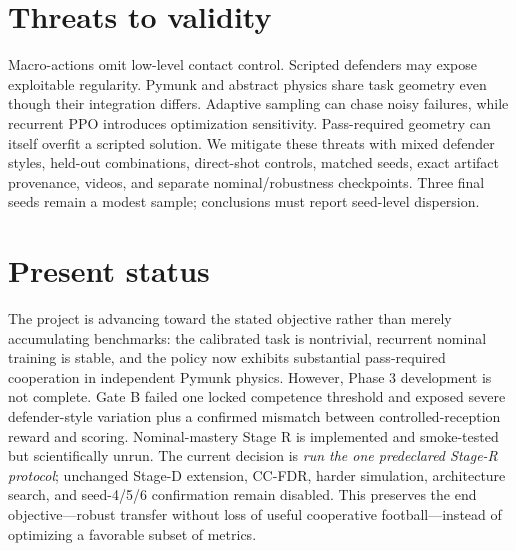 \documentclass[12pt,twocolumn]{article}
\begin{document}
\section{Threats to validity}
Macro-actions omit low-level contact control. Scripted defenders may expose exploitable regularity.
Pymunk and abstract physics share task geometry even though their integration differs. Adaptive
sampling can chase noisy failures, while recurrent PPO introduces optimization sensitivity.
Pass-required geometry can itself overfit a scripted solution. We mitigate these threats with
mixed defender styles, held-out combinations, direct-shot controls, matched seeds, exact artifact
provenance, videos, and separate nominal/robustness checkpoints. Three final seeds remain a modest
sample; conclusions must report seed-level dispersion.

\section{Present status}
The project is advancing toward the stated objective rather than merely accumulating benchmarks:
the calibrated task is nontrivial, recurrent nominal training is stable, and the policy now
exhibits substantial pass-required cooperation in independent Pymunk physics. However, Phase 3
development is not complete. Gate B failed one locked competence threshold and exposed severe
defender-style variation plus a confirmed mismatch between controlled-reception reward and
scoring. Nominal-mastery Stage R is implemented and smoke-tested but scientifically unrun. The
current decision is \emph{run the one predeclared Stage-R protocol}; unchanged
Stage-D extension, CC-FDR, harder simulation, architecture search, and seed-4/5/6 confirmation
remain disabled. This preserves the end objective---robust transfer without loss of useful
cooperative football---instead of optimizing a favorable subset of metrics.


  {}
  {}
\end{document}
